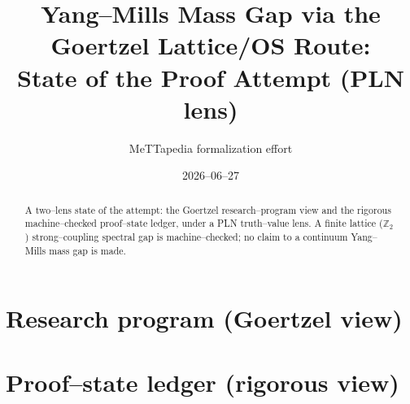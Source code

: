 \documentclass[11pt]{report}
\title{Yang--Mills Mass Gap via the Goertzel Lattice/OS Route:\\ State of the Proof Attempt (PLN lens)}
\author{MeTTapedia formalization effort}
\date{2026--06--27}
\begin{document}
\maketitle
\begin{abstract}
A two--lens state of the attempt: the Goertzel research--program view and the rigorous
machine--checked proof--state ledger, under a PLN truth--value lens. A finite lattice
($\mathbb{Z}_2$) strong--coupling spectral gap is machine--checked; no claim to a
continuum Yang--Mills mass gap is made.
\end{abstract}
\chapter{Research program (Goertzel view)}

\chapter{Proof--state ledger (rigorous view)}

\end{document}
